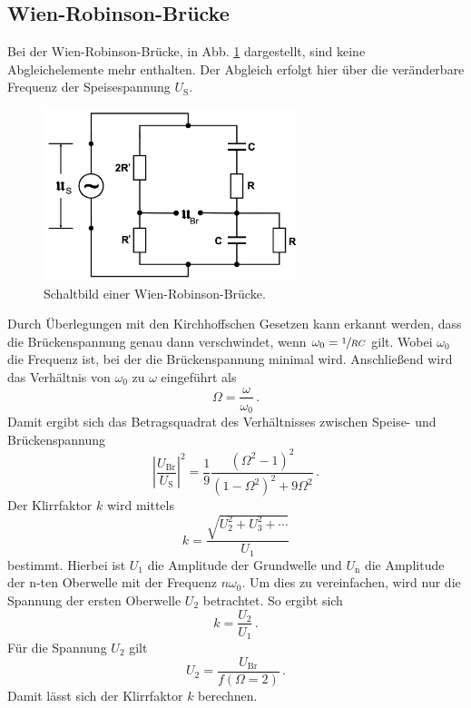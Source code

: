     \subsection{Wien-Robinson-Brücke}
    Bei der Wien-Robinson-Brücke, in Abb. \ref{fig:Wien_Robinson_Bruecke} dargestellt, sind keine Abgleichelemente mehr enthalten.
    Der Abgleich erfolgt hier über die veränderbare Frequenz der Speisespannung $U_\text{S}$.
    \begin{figure}
        \centering
        \includegraphics[height=5cm]{Messdaten/Wien-Robinson-Bruecke.jpg}
        \caption{Schaltbild einer Wien-Robinson-Brücke.}
        \label{fig:Wien_Robinson_Bruecke}
    \end{figure}
    Durch Überlegungen mit den Kirchhoffschen Gesetzen kann erkannt werden, dass die Brückenspannung genau dann verschwindet,
    wenn $\omega_0 = \sfrac{1}{RC}$ gilt.
    Wobei $\omega_0$ die Frequenz ist, bei der die Brückenspannung minimal wird.
    Anschließend wird das Verhältnis von $\omega_0$ zu $\omega$ eingeführt als
    \begin{equation*}
        \Omega = \frac{\omega}{\omega_0}\, \text{.}
    \end{equation*}
    Damit ergibt sich das Betragsquadrat des Verhältnisses zwischen Speise- und Brückenspannung
    \begin{equation}
        |\frac{U_\text{Br}}{U_\text{S}}|^2 = \frac{1}{9} \frac{(\Omega^2 - 1)^2}{(1 - \Omega^2)^2 + 9 \Omega^2} \, \text{.}
    \label{eq:theoriekurve}
    \end{equation}
    Der Klirrfaktor $k$ wird mittels
    \begin{equation}
        k = \frac{\sqrt {U_2^2 + U_3^2 + \dotsb}}{U_1}
        \label{eq:klirrfaktor}
    \end{equation}
    bestimmt.
    Hierbei ist $U_1$ die Amplitude der Grundwelle und $U_\text{n}$ die Amplitude der n-ten Oberwelle mit der Frequenz $n\omega_0$.
    Um dies zu vereinfachen, wird nur die Spannung der ersten Oberwelle $U_2$ betrachtet.
    So ergibt sich
    \begin{equation}
        k = \frac{U_2}{U_1} \, \text{.}
        \label{eq:klirrfaktor2}
    \end{equation}
    Für die Spannung $U_2$ gilt
    \begin{equation}
        U_2 = \frac{U_\text{Br}}{f(\Omega = 2)} \, \text{.}
        \label{eq:U_2}
    \end{equation}
    Damit lässt sich der Klirrfaktor $k$ berechnen.